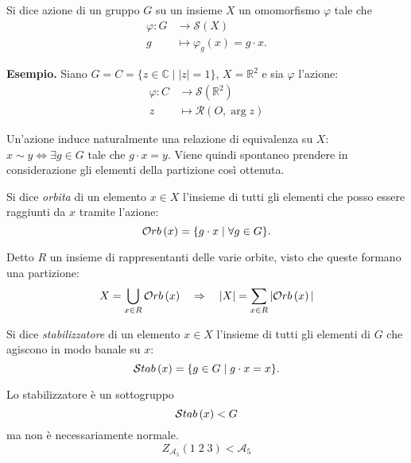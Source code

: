 \begin{multicols}{2}
\begin{definition}[Azione]
	Si dice azione di un gruppo $ G $ su un insieme $ X $ un omomorfismo $ \varphi $ tale che \begin{align*}
	\varphi \colon G &\to \mathcal{S}\left(X\right) \\
	g &\mapsto \varphi_g(x) = g \cdot x.
	\end{align*}
\end{definition}

\textbf{Esempio.} Siano $ G = C = \{ z \in \mathbb{C} \mid |z| = 1 \} $, $ X = \mathbb{R}^2 $ e sia $ \varphi $ l'azione: \begin{align*}
\varphi \colon C &\to \mathcal{S}\left(\mathbb{R}^2\right) \\
z &\mapsto \mathcal{R}(O, \arg z)
\end{align*}

\begin{remark}
	Un'azione induce naturalmente una relazione di equivalenza su $ X $: $ x \sim y \Leftrightarrow \exists g \in G $ tale che $ g \cdot x = y $. Viene quindi spontaneo prendere in considerazione gli elementi della partizione così ottenuta. 
\end{remark}
\begin{definition}[Orbita]
	Si dice \emph{orbita} di un elemento $ x \in X $ l'insieme di tutti gli elementi che posso essere raggiunti da $ x $ tramite l'azione: \[ \mathcal{O}rb\left( x \right) = \{ g \cdot x \mid \forall g \in G \}. \]
\end{definition}
\begin{remark}
	Detto $ R $ un insieme di rappresentanti delle varie orbite, visto che queste formano una partizione: \[ X = \bigcup_{x \in R} \mathcal{O}rb\left( x \right) \quad\Rightarrow\quad |X| = \sum_{x \in R} |\mathcal{O}rb\left( x \right)| \]
\end{remark}

\begin{definition}[Stabilizzatore]
	Si dice \emph{stabilizzatore} di un elemento $ x \in X $ l'insieme di tutti gli elementi di $ G $ che agiscono in modo banale su $ x $: \[ \mathcal{S}tab\left( x \right) = \{ g \in G \mid g \cdot x = x \}. \]
\end{definition}
\begin{remark}
	Lo stabilizzatore è un sottogruppo $$ \mathcal{S}tab\left( x \right) < G $$ ma non è necessariamente normale. $$  Z_{\mathcal{A}_{5}}(1 \; 2 \; 3) < \mathcal{A}_{5}$$
\end{remark}


\end{multicols}
